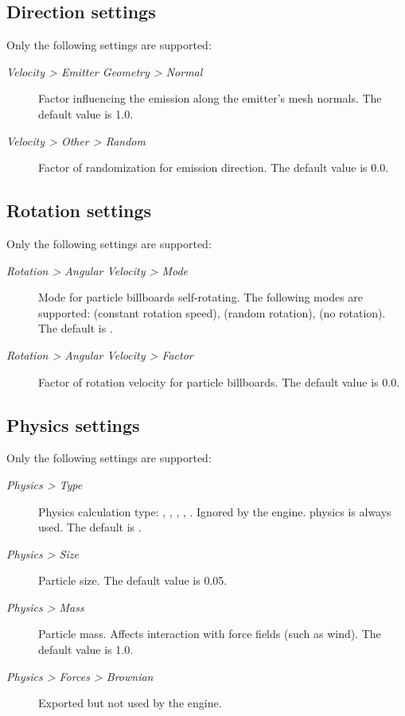 \documentclass[a4paper,12pt,oneside]{sphinxmanual}
\begin{document}
\subsection{Direction settings}
\label{particles:id8}
Only the following settings are supported:
\begin{description}
\item[{\emph{Velocity \textgreater{} Emitter Geometry \textgreater{} Normal}}] \leavevmode
Factor influencing the emission along the emitter's mesh normals. The default value is 1.0.

\item[{\emph{Velocity \textgreater{} Other \textgreater{} Random}}] \leavevmode
Factor of randomization for emission direction. The default value is 0.0.

\end{description}


\subsection{Rotation settings}
\label{particles:id9}
Only the following settings are supported:
\begin{description}
\item[{\emph{Rotation \textgreater{} Angular Velocity \textgreater{} Mode}}] \leavevmode
Mode for particle billboards self-rotating. The following modes are supported:  (constant rotation speed),  (random rotation),  (no rotation). The default is .

\item[{\emph{Rotation \textgreater{} Angular Velocity \textgreater{} Factor}}] \leavevmode
Factor of rotation velocity for particle billboards. The default value is 0.0.

\end{description}


\subsection{Physics settings}
\label{particles:id10}
Only the following settings are supported:
\begin{description}
\item[{\emph{Physics \textgreater{} Type}}] \leavevmode
Physics calculation type: , , , , . Ignored by the engine.  physics is always used. The default is .

\item[{\emph{Physics \textgreater{} Size}}] \leavevmode
Particle size. The default value is 0.05.

\item[{\emph{Physics \textgreater{} Mass}}] \leavevmode
Particle mass. Affects interaction with force fields (such as wind). The default value is 1.0.

\item[{\emph{Physics \textgreater{} Forces \textgreater{} Brownian}}] \leavevmode
Exported but not used by the engine.

\end{description}
\end{document}
